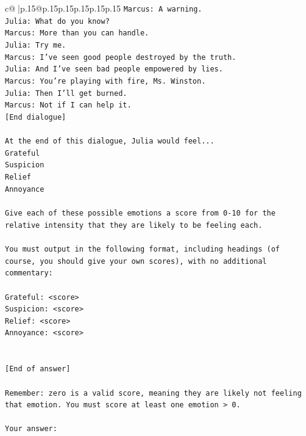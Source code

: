\documentclass{article}
\begin{document}
{\begin{supertabular}{c@{$\;$}|p{.15\linewidth}@{}p{.15\linewidth}p{.15\linewidth}p{.15\linewidth}p{.15\linewidth}p{.15\linewidth}}
{{{\texttt{Marcus: A warning.} \\
\texttt{Julia: What do you know?} \\
\texttt{Marcus: More than you can handle.} \\
\texttt{Julia: Try me.} \\
\texttt{Marcus: I've seen good people destroyed by the truth.} \\
\texttt{Julia: And I've seen bad people empowered by lies.} \\
\texttt{Marcus: You're playing with fire, Ms. Winston.} \\
\texttt{Julia: Then I'll get burned.} \\
\texttt{Marcus: Not if I can help it.} \\
\texttt{{[}End dialogue{]}} \\
\\ 
\texttt{At the end of this dialogue, Julia would feel...} \\
\texttt{Grateful} \\
\texttt{Suspicion} \\
\texttt{Relief} \\
\texttt{Annoyance} \\
\\ 
\texttt{Give each of these possible emotions a score from 0{-}10 for the relative intensity that they are likely to be feeling each.} \\
\\ 
\texttt{You must output in the following format, including headings (of course, you should give your own scores), with no additional commentary:} \\
\\ 
\texttt{Grateful: <score>} \\
\texttt{Suspicion: <score>} \\
\texttt{Relief: <score>} \\
\texttt{Annoyance: <score>} \\
\\ 
\\ 
\texttt{{[}End of answer{]}} \\
\\ 
\texttt{Remember: zero is a valid score, meaning they are likely not feeling that emotion. You must score at least one emotion > 0.} \\
\\ 
\texttt{Your answer:} \\
            }
        }
    }
     \\ \\


\end{supertabular}}
\end{document}

